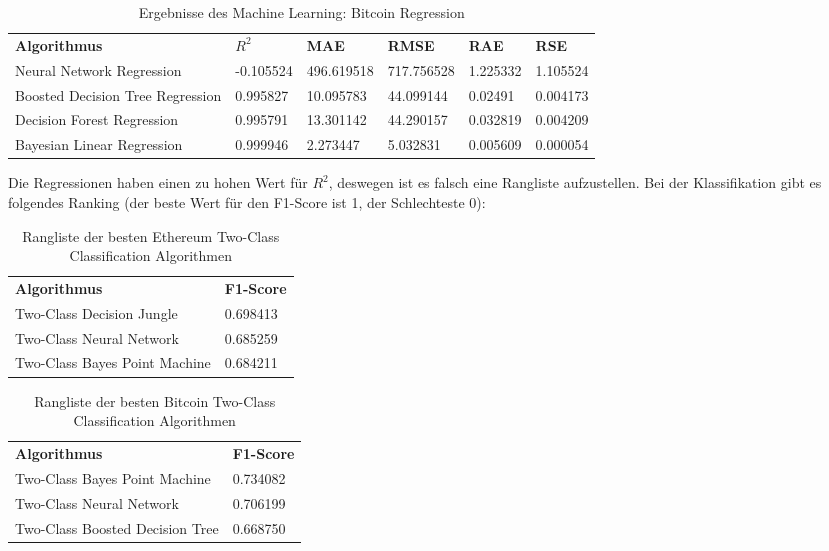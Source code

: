 \begin{table}[H]
\centering
\footnotesize
\begin{tabular}{|p{4cm}|p{}|p{}|p{}|p{}|p{}|}
\hline
\textbf{Algorithmus} & \textbf{$ R^2 $} & \textbf{MAE} & \textbf{RMSE} & \textbf{RAE} & \textbf{RSE}\\ 
\hhline{======}
Neural Network Regression & -0.105524 & 496.619518 & 717.756528 & 1.225332 & 1.105524 \\ \hline
Boosted Decision Tree Regression & 0.995827 & 10.095783 & 44.099144 & 0.02491 & 0.004173 \\ \hline
Decision Forest Regression & 0.995791 & 13.301142 & 44.290157 & 0.032819 & 0.004209 \\ \hline
Bayesian Linear Regression & 0.999946 & 2.273447 & 5.032831 & 0.005609 & 0.000054 \\ \hline
\end{tabular}
\caption{Ergebnisse des Machine Learning: Bitcoin Regression}
\end{table}

Die Regressionen haben einen zu hohen Wert für $ R^2 $, deswegen ist es falsch eine Rangliste aufzustellen. Bei der Klassifikation gibt es folgendes Ranking (der beste Wert für den F1-Score ist 1, der Schlechteste 0):
\begin{table}[H]
\centering
\footnotesize
\begin{tabular}{|p{4cm}|p{4cm}|}
\hline
\textbf{Algorithmus} & \textbf{F1-Score}\\ 
\hhline{==}
Two-Class Decision Jungle & 0.698413 \\ \hline
Two-Class Neural Network & 0.685259 \\ \hline
Two-Class Bayes Point Machine & 0.684211 \\ \hline
\end{tabular}
\caption{Rangliste der besten Ethereum Two-Class Classification Algorithmen}
\end{table}

\begin{table}[H]
\centering
\footnotesize
\begin{tabular}{|p{4cm}|p{4cm}|}
\hline
\textbf{Algorithmus} & \textbf{F1-Score}\\ 
\hhline{==}
Two-Class Bayes Point Machine & 0.734082 \\ \hline
Two-Class Neural Network & 0.706199 \\ \hline
Two-Class Boosted Decision Tree & 0.668750 \\ \hline
\end{tabular}
\caption{Rangliste der besten Bitcoin Two-Class Classification Algorithmen}
\end{table}

